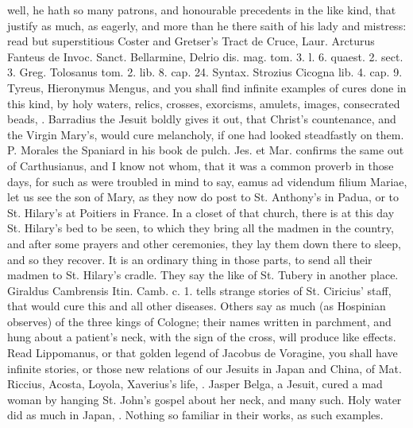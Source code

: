 {well, he hath so many patrons, and honourable precedents in the like
kind, that justify as much, as eagerly, and more than he there saith of
his lady and mistress: read but superstitious Coster and Gretser's
Tract de Cruce, Laur. Arcturus Fanteus de Invoc. Sanct. Bellarmine,
Delrio dis. mag. tom. 3. l. 6. quaest. 2. sect. 3. Greg. Tolosanus tom.
2. lib. 8. cap. 24. Syntax. Strozius Cicogna lib. 4. cap. 9. Tyreus,
Hieronymus Mengus, and you shall find infinite examples of cures done
in this kind, by holy waters, relics, crosses, exorcisms, amulets,
images, consecrated beads, \etc{}. Barradius the Jesuit boldly gives it
out, that Christ's countenance, and the Virgin Mary's, would cure
melancholy, if one had looked steadfastly on them. P. Morales the
Spaniard in his book de pulch. Jes. et Mar. confirms the same out of
Carthusianus, and I know not whom, that it was a common proverb in
those days, for such as were troubled in mind to say, eamus ad videndum
filium Mariae, let us see the son of Mary, as they now do post to St.
Anthony's in Padua, or to St. Hilary's at Poitiers in France.  In
a closet of that church, there is at this day St. Hilary's bed to be
seen, to which they bring all the madmen in the country, and after some
prayers and other ceremonies, they lay them down there to sleep, and so
they recover. It is an ordinary thing in those parts, to send all their
madmen to St. Hilary's cradle. They say the like of St. Tubery in
 another place. Giraldus Cambrensis Itin. Camb. c. 1. tells
strange stories of St. Ciricius' staff, that would cure this and all
other diseases. Others say as much (as Hospinian observes) of the
three kings of Cologne; their names written in parchment, and hung
about a patient's neck, with the sign of the cross, will produce like
effects. Read Lippomanus, or that golden legend of Jacobus de Voragine,
you shall have infinite stories, or those new relations of our
Jesuits in Japan and China, of Mat. Riccius, Acosta, Loyola,
Xaverius's life, \etc{}. Jasper Belga, a Jesuit, cured a mad woman by
hanging St. John's gospel about her neck, and many such. Holy water did
as much in Japan, \etc{}. Nothing so familiar in their works, as such
examples.

}
